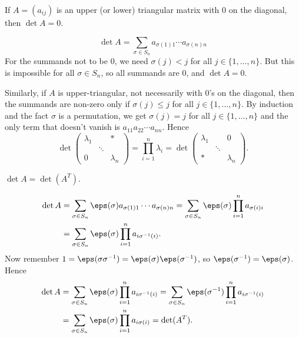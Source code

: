 \documentclass[12pt]{article}
\begin{document}
\begin{lemma}
	If $A = (a_{ij})$ is an upper (or lower) triangular matrix with $0$ on the diagonal, then $\det A = 0$.
\end{lemma}

\begin{proofbox}
	\[
		\det A = \sum_{\sigma \in S_n} a_{\sigma(1) 1} \cdots a_{\sigma(n) n}
	\]
	For the summands not to be $0$, we need $\sigma(j) < j$ for all $j \in \{1, \ldots, n\}$. But this is impossible for all $\sigma \in S_n$, so all summands are $0$, and $\det A = 0$.

	Similarly, if $A$ is upper-triangular, not necessarily with $0$'s on the diagonal, then the summands are non-zero only if $\sigma(j) \leq j$ for all $j \in \{1, \ldots, n\}$. By induction and the fact $\sigma$ is a permutation, we get $\sigma(j) = j$ for all $j \in \{1, \ldots, n\}$ and the only term that doesn't vanish is $a_{11}a_{22}\cdots a_{nn}$. Hence
	\[
	\det
	\begin{pmatrix}
		\lambda_1 & & \ast \\
		 & \ddots & \\
		0 &  & \lambda_n
	\end{pmatrix}
	= \prod_{i = 1}^{n} \lambda_i = \det
	\begin{pmatrix}
		\lambda_1 & & 0 \\
			  & \ddots & \\
		\ast & &\lambda_n
	\end{pmatrix}
	.\]
\end{proofbox}

\begin{lemma}
	$\det A = \det(A^{T})$.
\end{lemma}

\begin{proofbox}
	\begin{align*}
		\det A &= \sum_{\sigma \in S_n} \eps(\sigma) a_{\sigma(1) 1} \cdots a_{\sigma(n) n} = \sum_{\sigma \in S_n} \eps(\sigma) \prod_{i = 1}^{n} a_{\sigma(i) i} \\
		       &= \sum_{\sigma \in S_n} \eps(\sigma) \prod_{i = 1}^{n} a_{i \sigma^{-1}(i)}.
	\end{align*}
	Now remember $1 = \eps(\sigma \sigma^{-1}) = \eps(\sigma) \eps(\sigma^{-1})$, so $\eps(\sigma^{-1}) = \eps(\sigma)$. Hence
	\begin{align*}
		\det A &= \sum_{\sigma \in S_n} \eps(\sigma) \prod_{i = 1}^{n} a_{i \sigma^{-1}(i)} = \sum_{\sigma \in S_n} \eps(\sigma^{-1}) \prod_{i = 1}^{n}a_{i \sigma^{-1}(i)} \\
		       &= \sum_{\sigma \in S_n} \eps(\sigma) \prod_{i = 1}^{n} a_{i \sigma(i)} = \det (A^{T}).
	\end{align*}
\end{proofbox}
\end{document}
